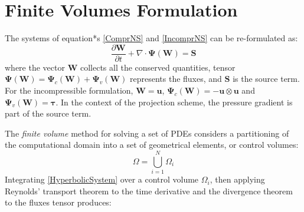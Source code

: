 \documentclass[11pt, a4paper, oneside, openany]{book}
\begin{document}
\section{Finite Volumes Formulation}\label{Chapter_Solver_Section_Finite_Volumes_Formulation}

The systems of equation*s \eqref{ComprNS} and \eqref{IncomprNS} can be re-formulated as:
\begin{equation*}
\dfrac{\partial\boldsymbol{W}}{\partial t}+\nabla\cdot\boldsymbol{\Psi}\left(\boldsymbol{W}\right)=\boldsymbol{S}\label{HyperbolicSystem}
\end{equation*}
where the vector $\boldsymbol{W}$ collects all the conserved quantities, tensor $\boldsymbol{\Psi}\left(\boldsymbol{W}\right)=\boldsymbol{\Psi}_{c}\left(\boldsymbol{W}\right)+\boldsymbol{\Psi}_{v}\left(\boldsymbol{W}\right)$ represents the fluxes, and $\boldsymbol{S}$ is the source term.  For the incompressible formulation, $\boldsymbol{W}= \boldsymbol{u}$, $\boldsymbol{\Psi}_{c}\left(\boldsymbol{W}\right)=-\boldsymbol{u}\otimes\boldsymbol{u}$ and $\boldsymbol{\Psi}_{v}\left(\boldsymbol{W}\right)=\boldsymbol{\tau}$. In the context of the projection scheme, the pressure gradient is part of the source term.\par
The \textit{finite volume} method for solving a set of PDEs considers a partitioning of the computational domain into a set of geometrical elements, or control volumes:
\begin{equation*}
\Omega=\bigcup_{i=1}^{N}\Omega_{i}
\end{equation*}
Integrating \eqref{HyperbolicSystem} over a control volume $\Omega_{i}$, then applying Reynolds' transport theorem to the time derivative and the divergence theorem to the fluxes tensor produces:
\end{document}
